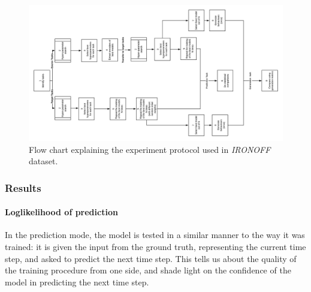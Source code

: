     \begin{figure}
      \includegraphics[scale=0.3]{images/sota/ironoff_results/IRONOFF_transfer_learning_flow.png}
      \caption[\textit{IRONOFF} experimental protocol]{Flow chart explaining the experiment protocol used in \textit{IRONOFF} dataset.}
      \label{fig:ironoff_protocol}
    \end{figure}

    \subsubsection{Results}

      \paragraph{Loglikelihood of prediction} In the prediction mode, the model is tested in a similar manner to the way it was trained: it is given the input from the ground truth, representing the current time step, and asked to predict the next time step. This tells us about the quality of the training procedure from one side, and shade light on the confidence of the model in predicting the next time step.

